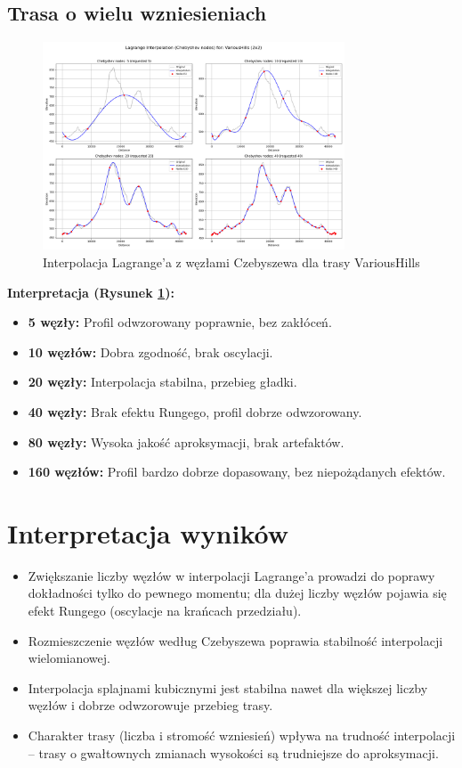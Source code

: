 \documentclass[11pt,a4paper]{article}
\begin{document}
\subsection{Trasa o wielu wzniesieniach}
\begin{figure}[H]
    \centering
    \includegraphics[width=0.8\textwidth]{plots/VariousHills_Lagrange_Chebyshev_2x2.png}
    \caption{Interpolacja Lagrange'a z węzłami Czebyszewa dla trasy VariousHills}
    \label{fig:wiele_wzniesien}
\end{figure}
\textbf{Interpretacja (Rysunek \ref{fig:wiele_wzniesien}):} 
\begin{itemize}
    \item \textbf{5 węzły:} Profil odwzorowany poprawnie, bez zakłóceń.
    \item \textbf{10 węzłów:} Dobra zgodność, brak oscylacji.
    \item \textbf{20 węzły:} Interpolacja stabilna, przebieg gładki.
    \item \textbf{40 węzły:} Brak efektu Rungego, profil dobrze odwzorowany.
    \item \textbf{80 węzły:} Wysoka jakość aproksymacji, brak artefaktów.
    \item \textbf{160 węzłów:} Profil bardzo dobrze dopasowany, bez niepożądanych efektów.
\end{itemize}

\newpage
\section{Interpretacja wyników}
\begin{itemize}
    \item Zwiększanie liczby węzłów w interpolacji Lagrange'a prowadzi do poprawy dokładności tylko do pewnego momentu; dla dużej liczby węzłów pojawia się efekt Rungego (oscylacje na krańcach przedziału).
    \item Rozmieszczenie węzłów według Czebyszewa poprawia stabilność interpolacji wielomianowej.
    \item Interpolacja splajnami kubicznymi jest stabilna nawet dla większej liczby węzłów i dobrze odwzorowuje przebieg trasy.
    \item Charakter trasy (liczba i stromość wzniesień) wpływa na trudność interpolacji -- trasy o gwałtownych zmianach wysokości są trudniejsze do aproksymacji.
\end{itemize}
\end{document}

